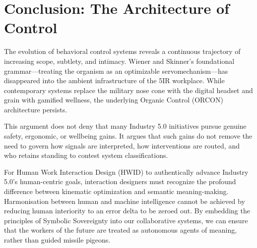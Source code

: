 \documentclass[11pt, a4paper]{article}
\begin{document}
\section{Conclusion: The Architecture of Control}

The evolution of behavioral control systems reveals a continuous trajectory of increasing scope, subtlety, and intimacy. Wiener and Skinner's foundational grammar---treating the organism as an optimizable servomechanism---has disappeared into the ambient infrastructure of the 5IR workplace. While contemporary systems replace the military nose cone with the digital headset and grain with gamified wellness, the underlying Organic Control (ORCON) architecture persists.

This argument does not deny that many Industry 5.0 initiatives pursue genuine safety, ergonomic, or wellbeing gains. It argues that such gains do not remove the need to govern how signals are interpreted, how interventions are routed, and who retains standing to contest system classifications.

For Human Work Interaction Design (HWID) to authentically advance Industry 5.0's human-centric goals, interaction designers must recognize the profound difference between kinematic optimization and semantic meaning-making. Harmonisation between human and machine intelligence cannot be achieved by reducing human interiority to an error delta to be zeroed out. By embedding the principles of Symbolic Sovereignty into our collaborative systems, we can ensure that the workers of the future are treated as autonomous agents of meaning, rather than guided missile pigeons.
\end{document}
